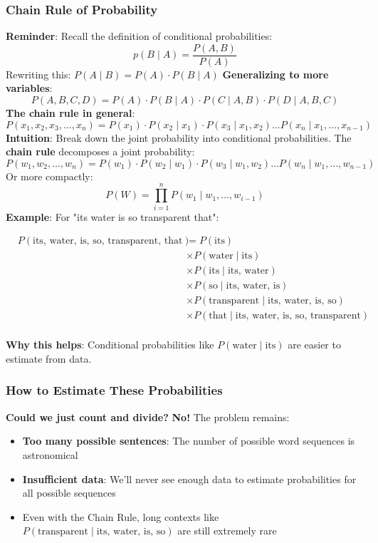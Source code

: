 \documentclass[a4paper]{article}
\theoremstyle{definition}
\begin{document}
\subsubsection{Chain Rule of Probability}
\textbf{Reminder}: Recall the definition of conditional probabilities:
\[
  p(B \;|\; A) = \frac{P(A,B)}{P(A)}
\]
Rewriting this: \( P(A \;|\; B) = P(A) \cdot P(B \;|\; A) \)
\vspace{1em}
\noindent 
\newline
\textbf{Generalizing to more variables}:
\[
  P(A,B,C,D) = P(A) \cdot P(B \;|\; A) \cdot P(C \;|\; A,B) \cdot P(D \;|\; A,B,C)  
\]
\textbf{The chain rule in general}:
\[
  P(x_1,x_2,x_3,\ldots,x_n) = P(x_1) \cdot P(x_2 \;|\; x_1) \cdot P(x_3 \;|\; x_1,x_2) \ldots P(x_n \;|\; x_1, \ldots, x_{n - 1})
\]
\textbf{Intuition}: Break down the joint probability into conditional probabilities.
\vspace{1em}
\noindent
\newline
The \textbf{chain rule} decomposes a joint probability:
\[
  P(w_1,w_2,\ldots,w_n) = P(w_1) \cdot P(w_2 \;|\; w_1) \cdot P(w_3 \;|\; w_1, w_2) \ldots P(w_n \;|\; w_1, \ldots, w_{n - 1})
\]
Or more compactly:
\[
  P(W) = \prod_{i = 1}^{n} P(w_1 \;|\; w_1,\ldots,w_{i - 1})
\]
\textbf{Example}: For "its water is so transparent that":
\begin{center}
    \begin{align*}
        &P(\text{its, water, is, so, transparent, that}) & = P(\text{its}) \\
        & & \times P(\text{water} \;|\; \text{its}) \\
        & & \times P(\text{its} \;|\; \text{its, water}) \\
        & & \times P(\text{so} \;|\; \text{its, water, is}) \\
        & & \times P(\text{transparent} \;|\; \text{its, water, is, so}) \\
        & & \times P(\text{that} \;|\; \text{its, water, is, so, transparent}) \\
    \end{align*}
\end{center}
\textbf{Why this helps}: Conditional probabilities like \( P(\text{water} \;|\; \text{its}) \) are easier to estimate from data.
\subsubsection{How to Estimate These Probabilities}
\textbf{Could we just count and divide?}
\vspace{1em}
\noindent
\newline
\textbf{No!} The problem remains:
\begin{itemize}
    \item \textbf{Too many possible sentences}: The number of possible word sequences is astronomical 
    \item \textbf{Insufficient data}: We'll never see enough data to estimate probabilities for all possible sequences 
    \item Even with the Chain Rule, long contexts like \( P(\text{transparent} \;|\; \text{its, water, is, so}) \) are still extremely rare
\end{itemize}
\end{document}
